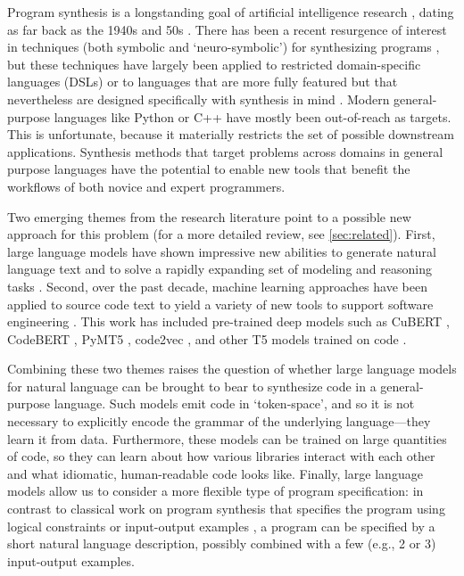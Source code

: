 Program synthesis is a longstanding goal of artificial intelligence research
\citep{TOWARDAUTOMATIC, PROW, LISP, LISP2, REACTIVE, KNOWLEDGEANDREASONING}, dating as far back as the 1940s and 50s \citep{TURING, FORTRAN}. There has been a recent resurgence of interest in techniques (both symbolic and `neuro-symbolic') for synthesizing programs \citep{DEEPCODER,ROBUSTFILL,ECSQUARED,DREAMCODER, BUSTLE}, but these techniques have largely been applied to restricted domain-specific languages (DSLs) \citep{FLASHFILL} or to languages that are more fully featured but that nevertheless are designed specifically with synthesis in mind \citep{PROPERTYSIGNATURES}. Modern general-purpose languages like Python or C++ have mostly been out-of-reach as targets. This is unfortunate, because it materially restricts the set of possible downstream applications. Synthesis methods that target problems across domains in general purpose languages have the potential to enable new tools that benefit the workflows of both novice and expert programmers.

Two emerging themes from the research literature point to a possible new approach for this problem (for a more detailed review, see \autoref{sec:related}).
First, large language models have shown impressive new abilities to generate natural language text \citep{GPT3,T5} and to solve a rapidly expanding set of modeling and reasoning tasks \citep{BERT, bigbench}. Second, over the past decade, machine learning approaches have been applied to source code text to yield a variety of new tools to support software engineering  \citep{naturalness-survey}. This work has included pre-trained deep models such as CuBERT \citep{cubert}, CodeBERT \citep{codebert}, PyMT5 \citep{clement2020pymt5}, code2vec \citep{code2vec}, and other T5 models trained on code \citep{Mastropaolo2021-cl}.

Combining these two themes raises the question of whether large language models for natural language can be brought to bear to synthesize code in a general-purpose language. Such models emit code in `token-space', and so it is not necessary to explicitly encode the grammar of the underlying language---they learn it from data. Furthermore, these models can be trained on large quantities of code, so they can learn about how various libraries interact with each other and what idiomatic, human-readable code looks like. Finally, large language models allow us to consider a more flexible type of program specification: in contrast to classical work on program synthesis that specifies the program using logical constraints or input-output examples \citep{RISHABHSURVEY}, a program can be specified by a short natural language description, possibly combined with a few (e.g., 2 or 3) input-output examples.

